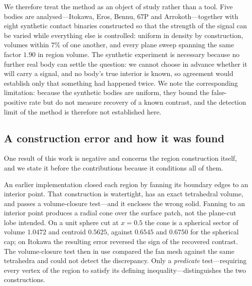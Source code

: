 We therefore treat the method as an object of study rather than a tool.
Five bodies are analysed---Itokawa, Eros, Bennu, 67P and
Arrokoth---together with eight synthetic contact binaries constructed so
that the strength of the signal can be varied while everything else is
controlled: uniform in density by construction, volumes within $7\%$ of
one another, and every plane sweep spanning the same factor $1.90$ in
region volume. The synthetic experiment is necessary because no further
real body can settle the question: we cannot choose in advance whether
it will carry a signal, and no body's true interior is known, so
agreement would establish only that something had happened twice. We
note the corresponding limitation: because the synthetic bodies are
uniform, they bound the false-positive rate but do not measure recovery
of a known contrast, and the detection limit of the method is therefore
not established here.

\subsection{A construction error and how it was found}
\label{sec:intro:construction}

One result of this work is negative and concerns the region construction
itself, and we state it before the contributions because it conditions
all of them.

An earlier implementation closed each region by fanning its boundary
edges to an interior point. That construction is watertight, has an
exact tetrahedral volume, and passes a volume-closure test---and it
encloses the wrong solid. Fanning to an interior point produces a radial
cone over the surface patch, not the plane-cut lobe intended. On a unit
sphere cut at $x=0.5$ the cone is a spherical sector of volume $1.0472$
and centroid $0.5625$, against $0.6545$ and $0.6750$ for the spherical
cap; on Itokawa the resulting error reversed the sign of the recovered
contrast. The volume-closure test then in use compared the fan mesh
against the same tetrahedra and could not detect the discrepancy. Only a
\emph{predicate} test---requiring every vertex of the region to satisfy
its defining inequality---distinguishes the two constructions.


